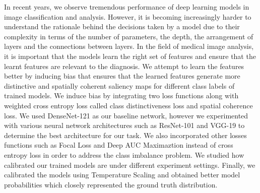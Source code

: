 


\begin{abstracts}        %

In recent years, we observe tremendous performance of deep learning models in
image classification and analysis. However, it is becoming increasingly harder to
understand the rationale behind the decisions taken by a model due to their
complexity in terms of the number of parameters, the depth, the arrangement of
layers and the connections between layers. In the field of medical image analysis, it
is important that the models learn the right set of features and ensure that the learnt
features are relevant to the diagnosis. We attempt to learn the features better by
inducing bias that ensures that the learned features generate more distinctive and
spatially coherent saliency maps for different class labels of trained models. We
induce bias by integrating two loss functions along with weighted cross entropy
loss called class distinctiveness loss and spatial coherence loss. We used DenseNet-121 as our baseline network, however we experimented with various neural network architectures such as ResNet-101 and VGG-19 to determine the best architecture for our task. We also incorporated other losses functions such as Focal Loss and Deep AUC Maximaztion instead of cross entropy loss in order to address the class imbalance problem. We studied how calibrated our trained models are under different experiment settings. Finally, we calibrated the models using Temperature Scaling and obtained better model probabilities which closely represented the ground truth distribution. 


\end{abstracts}




